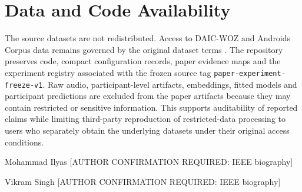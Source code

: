 \documentclass[lettersize,journal]{IEEEtran}
\begin{document}
\section{Data and Code Availability}

The source datasets are not redistributed. Access to DAIC-WOZ and Androids Corpus data remains governed by the original dataset terms \cite{gratch2014distress,valstar2016avec,tao2023androids}. The repository preserves code, compact configuration records, paper evidence maps and the experiment registry associated with the frozen source tag \texttt{paper-experiment-freeze-v1}. Raw audio, participant-level artifacts, embeddings, fitted models and participant predictions are excluded from the paper artifacts because they may contain restricted or sensitive information. This supports auditability of reported claims while limiting third-party reproduction of restricted-data processing to users who separately obtain the underlying datasets under their original access conditions.






\begin{IEEEbiography}{Mohammad Ilyas}
[AUTHOR CONFIRMATION REQUIRED: IEEE biography]
\end{IEEEbiography}

\begin{IEEEbiography}{Vikram Singh}
[AUTHOR CONFIRMATION REQUIRED: IEEE biography]
\end{IEEEbiography}
\end{document}
